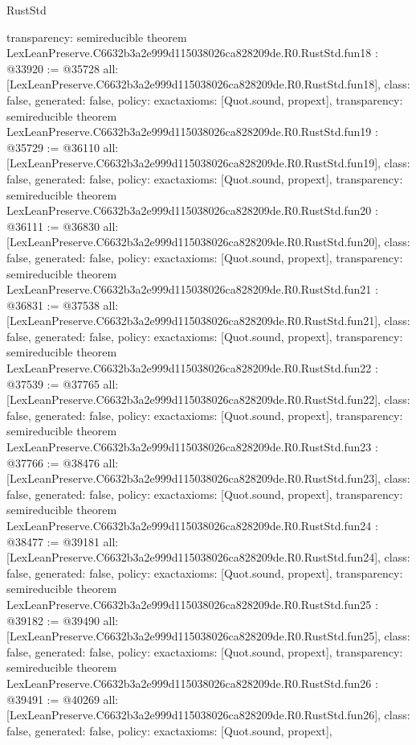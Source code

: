 \begin{lexlean}{RustStd}
\begin{coremodule}
{  transparency: semireducible
}
theorem LexLeanPreserve.C6632b3a2e999d115038026ca828209de.R0.RustStd.fun18 : @33920 := @35728 {
  all: [LexLeanPreserve.C6632b3a2e999d115038026ca828209de.R0.RustStd.fun18],
  class: false,
  generated: false,
  policy: exact{axioms: [Quot.sound, propext]},
  transparency: semireducible
}
theorem LexLeanPreserve.C6632b3a2e999d115038026ca828209de.R0.RustStd.fun19 : @35729 := @36110 {
  all: [LexLeanPreserve.C6632b3a2e999d115038026ca828209de.R0.RustStd.fun19],
  class: false,
  generated: false,
  policy: exact{axioms: [Quot.sound, propext]},
  transparency: semireducible
}
theorem LexLeanPreserve.C6632b3a2e999d115038026ca828209de.R0.RustStd.fun20 : @36111 := @36830 {
  all: [LexLeanPreserve.C6632b3a2e999d115038026ca828209de.R0.RustStd.fun20],
  class: false,
  generated: false,
  policy: exact{axioms: [Quot.sound, propext]},
  transparency: semireducible
}
theorem LexLeanPreserve.C6632b3a2e999d115038026ca828209de.R0.RustStd.fun21 : @36831 := @37538 {
  all: [LexLeanPreserve.C6632b3a2e999d115038026ca828209de.R0.RustStd.fun21],
  class: false,
  generated: false,
  policy: exact{axioms: [Quot.sound, propext]},
  transparency: semireducible
}
theorem LexLeanPreserve.C6632b3a2e999d115038026ca828209de.R0.RustStd.fun22 : @37539 := @37765 {
  all: [LexLeanPreserve.C6632b3a2e999d115038026ca828209de.R0.RustStd.fun22],
  class: false,
  generated: false,
  policy: exact{axioms: [Quot.sound, propext]},
  transparency: semireducible
}
theorem LexLeanPreserve.C6632b3a2e999d115038026ca828209de.R0.RustStd.fun23 : @37766 := @38476 {
  all: [LexLeanPreserve.C6632b3a2e999d115038026ca828209de.R0.RustStd.fun23],
  class: false,
  generated: false,
  policy: exact{axioms: [Quot.sound, propext]},
  transparency: semireducible
}
theorem LexLeanPreserve.C6632b3a2e999d115038026ca828209de.R0.RustStd.fun24 : @38477 := @39181 {
  all: [LexLeanPreserve.C6632b3a2e999d115038026ca828209de.R0.RustStd.fun24],
  class: false,
  generated: false,
  policy: exact{axioms: [Quot.sound, propext]},
  transparency: semireducible
}
theorem LexLeanPreserve.C6632b3a2e999d115038026ca828209de.R0.RustStd.fun25 : @39182 := @39490 {
  all: [LexLeanPreserve.C6632b3a2e999d115038026ca828209de.R0.RustStd.fun25],
  class: false,
  generated: false,
  policy: exact{axioms: [Quot.sound, propext]},
  transparency: semireducible
}
theorem LexLeanPreserve.C6632b3a2e999d115038026ca828209de.R0.RustStd.fun26 : @39491 := @40269 {
  all: [LexLeanPreserve.C6632b3a2e999d115038026ca828209de.R0.RustStd.fun26],
  class: false,
  generated: false,
  policy: exact{axioms: [Quot.sound, propext]},
}
\end{coremodule}
\end{lexlean}
